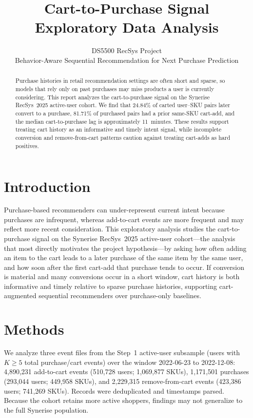 \documentclass[11pt]{article}
\title{Cart-to-Purchase Signal Exploratory Data Analysis}
\author{DS5500 RecSys Project\\
Behavior-Aware Sequential Recommendation for Next Purchase Prediction}
\date{}
\begin{document}
\maketitle

\begin{abstract}
Purchase histories in retail recommendation settings are often short and sparse, so models that rely only on past purchases may miss products a user is currently considering. This report analyzes the cart-to-purchase signal on the Synerise RecSys~2025 active-user cohort. We find that 24.84\% of carted user--SKU pairs later convert to a purchase, 81.71\% of purchased pairs had a prior same-SKU cart-add, and the median cart-to-purchase lag is approximately 11~minutes. These results support treating cart history as an informative and timely intent signal, while incomplete conversion and remove-from-cart patterns caution against treating cart-adds as hard positives.
\end{abstract}

\section{Introduction}
Purchase-based recommenders can under-represent current intent because purchases are infrequent, whereas add-to-cart events are more frequent and may reflect more recent consideration. This exploratory analysis studies the cart-to-purchase signal on the Synerise RecSys~2025 active-user cohort---the analysis that most directly motivates the project hypothesis---by asking how often adding an item to the cart leads to a later purchase of the same item by the same user, and how soon after the first cart-add that purchase tends to occur. If conversion is material and many conversions occur in a short window, cart history is both informative and timely relative to sparse purchase histories, supporting cart-augmented sequential recommenders over purchase-only baselines.

\section{Methods}
We analyze three event files from the Step~1 active-user subsample (users with $K \geq 5$ total purchase/cart events) over the window 2022-06-23 to 2022-12-08: 4,890,231 add-to-cart events (510,728 users; 1,069,877 SKUs), 1,171,501 purchases (293,044 users; 449,958 SKUs), and 2,229,315 remove-from-cart events (423,386 users; 741,269 SKUs). Records were deduplicated and timestamps parsed. Because the cohort retains more active shoppers, findings may not generalize to the full Synerise population.
\end{document}
